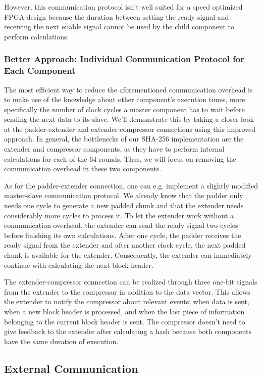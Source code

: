 However, this communication protocol isn't well suited for a speed optimized FPGA design because the duration between setting the ready signal and receiving the next enable signal cannot be used by the child component to perform calculations.

\subsubsection*{Better Approach: Individual Communication Protocol for Each Component}

The most efficient way to reduce the aforementioned communication overhead is to make use of the knowledge about other component's execution times, more specifically the number of clock cycles a master component has to wait before sending the next data to its slave. We'll demonstrate this by taking a closer look at the padder-extender and extender-compressor connections using this improved approach. In general, the bottlenecks of our SHA-256 implementation are the extender and compressor components, as they have to perform internal calculations for each of the 64 rounds. Thus, we will focus on removing the communication overhead in these two components.

As for the padder-extender connection, one can e.g. implement a slightly modified master-slave communication protocol. We already know that the padder only needs one cycle to generate a new padded chunk and that the extender needs considerably more cycles to process it. To let the extender work without a communication overhead, the extender can send the ready signal two cycles before finishing its own calculations. After one cycle, the padder receives the ready signal from the extender and after another clock cycle, the next padded chunk is available for the extender. Consequently, the extender can immediately continue with calculating the next block header.

The extender-compressor connection can be realized through three one-bit signals from the extender to the compressor in addition to the data vector. This allows the extender to notify the compressor about relevant events: when data is sent, when a new block header is processed, and when the last piece of information belonging to the current block header is sent. The compressor doesn't need to give feedback to the extender after calculating a hash because both components have the same duration of execution.

\subsection{External Communication}  
\label{ssec:externalCommunication}

